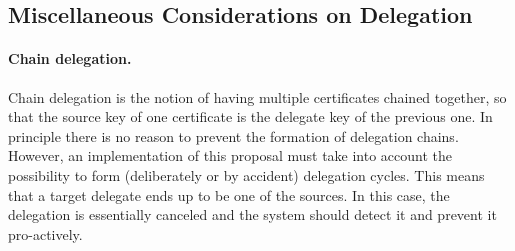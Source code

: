 \subsection*{Miscellaneous Considerations on Delegation}

\paragraph{Chain delegation.}
Chain delegation is the notion of having multiple certificates chained together,
so that the source key of one certificate is the delegate key of the previous
one. In principle there is no reason to prevent the formation of delegation
chains. However, an implementation of this proposal must take into account the
possibility to form (deliberately or by accident) delegation cycles. This means
that a target delegate ends up to be one of the sources. In this case, the
delegation is essentially canceled and the system should detect it and prevent
it pro-actively.



